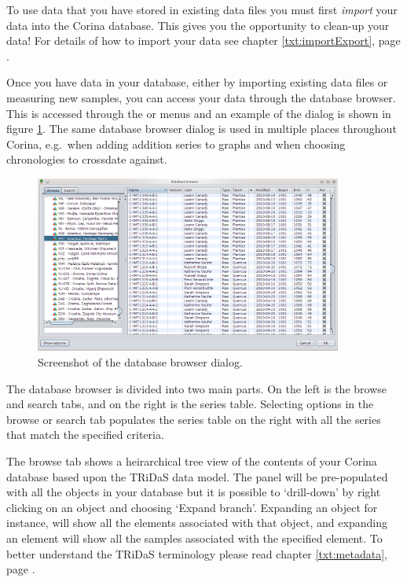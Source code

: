 To use data that you have stored in existing data files you must first \emph{import} your data into the Corina database.  This gives you the opportunity to clean-up your data!  For details of how to import your data see chapter \ref{txt:importExport}, page \pageref{txt:importExport}.

Once you have data in your database, either by importing existing data files or measuring new samples, you can access your data through the database browser.  This is accessed through the  or  menus and an example of the dialog is shown in figure \ref{fig:dbbrowser}. The same database browser dialog is used in multiple places throughout Corina, e.g.\ when adding addition series to graphs and when choosing chronologies to crossdate against. 

\begin{figure}[hbtp]
  \centering
    \includegraphics[width=0.9\textwidth]{Images/dbbrowser.png}
    \caption{Screenshot of the database browser dialog.}
    \label{fig:dbbrowser}
\end{figure}

The database browser is divided into two main parts.  On the left is the browse and search tabs, and on the right is the series table.  Selecting options in the browse or search tab populates the series table on the right with all the series that match the specified criteria.  


The browse tab shows a heirarchical tree view of the contents of your Corina database based upon the TRiDaS data model.  The panel will be pre-populated with all the objects in your database but it is possible to `drill-down' by right clicking on an object and choosing `Expand branch'.  Expanding an object for instance, will show all the elements associated with that object, and expanding an element will show all the samples associated with the specified element.  To better understand the TRiDaS terminology please read chapter \ref{txt:metadata}, page \pageref{txt:metadata}.

